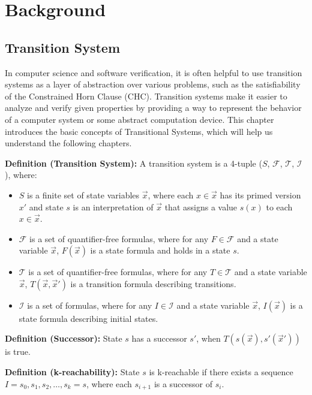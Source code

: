 
\chapter{Background}

\section{Transition System}
\noindent In computer science and software verification, it is often helpful to use transition systems as a layer of abstraction over various problems, such as the satisfiability of the Constrained Horn Clause (CHC). Transition systems make it easier to analyze and verify given properties by providing a way to represent the behavior of a computer system or some abstract computation device. This chapter introduces the basic concepts of Transitional Systems, which will help us understand the following chapters.

\vspace{\baselineskip}\noindent\textbf{Definition (Transition System)\cite{7886665}:} A transition system is a 4-tuple ($S$, $\mathcal{F}$, $\mathcal{T}$, $\mathcal{I}$), where:
\begin{itemize}
    \item $S$ is a finite set of state variables $\vec{x}$, where each $x \in \vec{x}$ has its primed version $x'$ and state $s$ is an interpretation of $\vec{x}$ that assigns a value $s(x)$ to each $x \in \vec{x}$.
    \item $\mathcal{F}$ is a set of quantifier-free formulas, where for any $F \in \mathcal{F}$ and a state variable $\vec{x}$, $F(\vec{x})$ is a state formula and holds in a state $s$.
    \item $\mathcal{T}$ is a set of quantifier-free formulas, where for any $T \in \mathcal{T}$ and a state variable $\vec{x}$, $T(\vec{x}, \vec{x}')$ is a transition formula describing transitions.
    \item $\mathcal{I}$ is a set of formulas, where for any $I \in \mathcal{I}$ and a state variable $\vec{x}$, $I(\vec{x})$ is a state formula describing initial states.
\end{itemize}

\vspace{\baselineskip}\noindent\textbf{Definition (Successor):\cite{7886665}} State $s$ has a successor $s'$, when $T(s(\vec{x}), s'(\vec{x}'))$ is true.

\vspace{\baselineskip}\noindent\textbf{Definition (k-reachability):\cite{7886665}} State $s$ is k-reachable if there exists a sequence \newline\noindent $I = s_0, s_1, s_2, \ldots, s_k = s$, where each $s_{i+1}$ is a successor of $s_i$.

